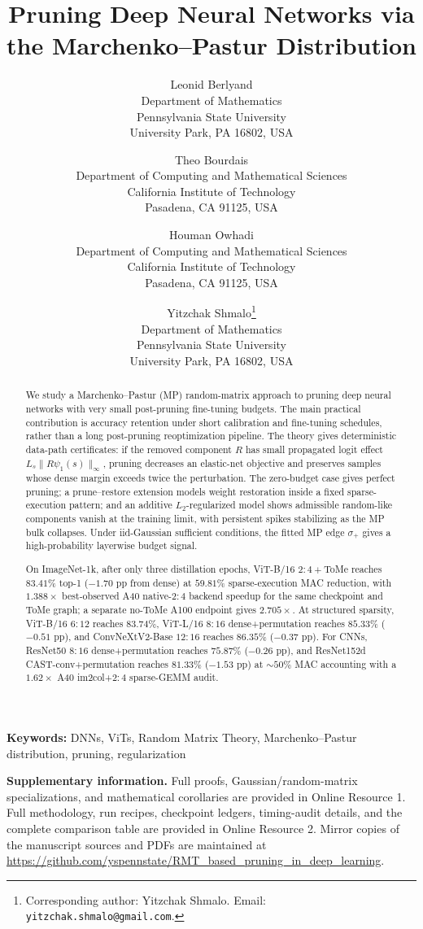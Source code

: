 \documentclass[11pt]{article}
\title{\textbf{Pruning Deep Neural Networks via the Marchenko--Pastur Distribution}}
\author{
    Leonid Berlyand \\
    {\small Department of Mathematics} \\
    {\small Pennsylvania State University} \\
    {\small University Park, PA 16802, USA}
    \and
    Theo Bourdais\\
    {\small Department of Computing and Mathematical Sciences} \\
    {\small California Institute of Technology} \\
    {\small Pasadena, CA 91125, USA}
    \and
    Houman Owhadi\\
    {\small Department of Computing and Mathematical Sciences} \\
    {\small California Institute of Technology} \\
    {\small Pasadena, CA 91125, USA}
    \and
    Yitzchak Shmalo\thanks{Corresponding author: Yitzchak Shmalo. Email: \texttt{yitzchak.shmalo@gmail.com}.} \\
    {\small Department of Mathematics} \\
    {\small Pennsylvania State University} \\
    {\small University Park, PA 16802, USA}
}
\date{}
\theoremstyle{plain}
\theoremstyle{definition}
\theoremstyle{remark}
\newcommand{\1}{\mathbf{1}}
\newcommand{\repoURL}{\url{https://github.com/yspennstate/RMT_based_pruning_in_deep_learning}}
\begin{document}
\maketitle

\begin{abstract}
We study a Marchenko--Pastur (MP) random-matrix approach to pruning deep neural networks with very small post-pruning fine-tuning budgets. The main practical contribution is accuracy retention under short calibration and fine-tuning schedules, rather than a long post-pruning reoptimization pipeline. The theory gives deterministic data-path certificates: if the removed component \(R\) has small propagated logit effect \(L_s\|R\psi_1(s)\|_\infty\), pruning decreases an elastic-net objective and preserves samples whose dense margin exceeds twice the perturbation. The zero-budget case gives perfect pruning; a prune--restore extension models weight restoration inside a fixed sparse-execution pattern; and an additive \(L_2\)-regularized model shows admissible random-like components vanish at the training limit, with persistent spikes stabilizing as the MP bulk collapses. Under iid-Gaussian sufficient conditions, the fitted MP edge \(\sigma_+\) gives a high-probability layerwise budget signal.

On ImageNet-1k, after only three distillation epochs, ViT-B/16 \(2{:}4{+}\)ToMe reaches \(83.41\%\) top-1 (\(-1.70\) pp from dense) at \(59.81\%\) sparse-execution MAC reduction, with \(1.388\times\) best-observed A40 native-\(2{:}4\) backend speedup for the same checkpoint and ToMe graph; a separate no-ToMe A100 endpoint gives \(2.705\times\). At structured sparsity, ViT-B/16 \(6{:}12\) reaches \(83.74\%\), ViT-L/16 \(8{:}16\) dense+permutation reaches \(85.33\%\) (\(-0.51\) pp), and ConvNeXtV2-Base \(12{:}16\) reaches \(86.35\%\) (\(-0.37\) pp). For CNNs, ResNet50 \(8{:}16\) dense+permutation reaches \(75.87\%\) (\(-0.26\) pp), and ResNet152d CAST-conv+permutation reaches \(81.33\%\) (\(-1.53\) pp) at \(\sim50\%\) MAC accounting with a \(1.62\times\) A40 im2col+\(2{:}4\) sparse-GEMM audit.
\end{abstract}

\noindent\textbf{Keywords:} DNNs, ViTs, Random Matrix Theory, Marchenko--Pastur distribution, pruning, regularization


\noindent\textbf{Supplementary information.}
Full proofs, Gaussian/random-matrix specializations, and mathematical corollaries are provided in Online Resource 1. Full methodology, run recipes, checkpoint ledgers, timing-audit details, and the complete comparison table are provided in Online Resource 2. Mirror copies of the manuscript sources and PDFs are maintained at \repoURL.
\end{document}
